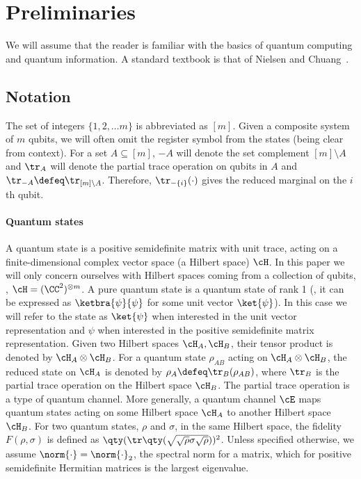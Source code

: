 \documentclass{toc}
\begin{document}
\section{Preliminaries}
\label{sec:preliminaries}

We will assume that the reader is familiar with the basics of quantum computing and quantum information. %
A standard textbook is that of Nielsen and Chuang~\cite{Nielsen_Chuang_2010}.
%

\subsection{Notation}
\label{subsec:notation}

The set of integers $\{1,2,\ldots m\}$ is abbreviated as $[m]$. Given a composite system of $m$ qubits, we will often omit the register symbol from the states (being clear from context). For a set $A\subseteq [m]$, $-A$ will denote the set complement $[m] \setminus A$ and $\tr_A$ will denote the partial trace operation on qubits in $A$ and $\tr_{-A}\defeq\tr_{[m]\setminus A}$. Therefore, $\tr_{-\{i\}}(\cdot)$ gives the reduced marginal on the $i$th qubit.

\paragraph{Quantum states} A quantum state is a positive semidefinite matrix with unit trace, acting on a finite-dimensional complex vector space (a Hilbert space) $\cH$. In this paper we will only concern ourselves with Hilbert spaces coming from a collection of qubits, \ie, $\cH = (\CC^2)^{\otimes m}$. A pure quantum state is a quantum state
%
of   %
rank 1 (\ie, it can be expressed as $\ketbra{\psi}{\psi}$ for some unit vector $\ket{\psi}$). In
%
this  %
case we will refer to the state as $\ket{\psi}$ when interested in the unit vector representation and $\psi$ when interested in the positive semidefinite matrix representation. Given two Hilbert spaces $\cH_A,\cH_B$, their tensor product is denoted by $\cH_A\otimes \cH_B$. For a quantum state $\rho_{AB}$ acting on $\cH_A\otimes \cH_B$, the reduced state on $\cH_A$ is denoted by $\rho_A\defeq \tr_{B}(\rho_{AB})$, where $\tr_B$ is the partial trace operation on the Hilbert space $\cH_B$. The partial trace operation is a type of quantum channel. More generally, a quantum channel $\cE$ maps quantum states acting on some Hilbert space $\cH_A$ to another Hilbert space $\cH_B$. For two quantum states,
$\rho$ and $\sigma$,  %
in the same Hilbert space, the fidelity $F(\rho, \sigma)$ is defined as $\qty(\tr\qty(\sqrt{\sqrt{\rho} \sigma \sqrt{\rho}}))^2$. Unless
%
specified otherwise,  %
we assume $\norm{\cdot} = \norm{\cdot}_2$, the spectral norm for a matrix, which for
positive semidefinite  %
%
Hermitian matrices is the largest eigenvalue. 
\end{document}
